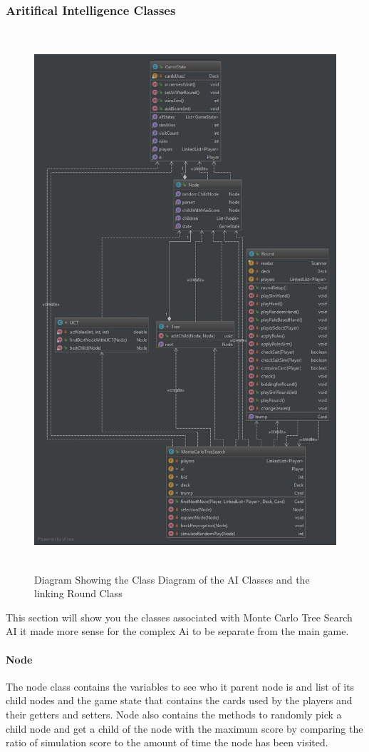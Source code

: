 \subsubsection{Aritifical Intelligence Classes}
\begin{figure}[h]
\centering
\includegraphics[width=15cm ,height=20cm,keepaspectratio]{AI_Classes}
\caption{Diagram Showing the Class Diagram of the AI Classes and the linking Round Class}
\label{fig:AI_Classes}
\end{figure}
This section will show you the classes associated with Monte Carlo Tree Search AI it made more sense for the complex Ai to be separate from the main game.
\paragraph{Node}
The node class contains the variables to see who it parent node is and list of its child nodes and the game state that contains the cards used by the players and their getters and setters. Node also contains the methods to randomly pick a child node and get a child of the node with the maximum score by comparing the ratio of simulation score to the amount of time the node has been visited.
